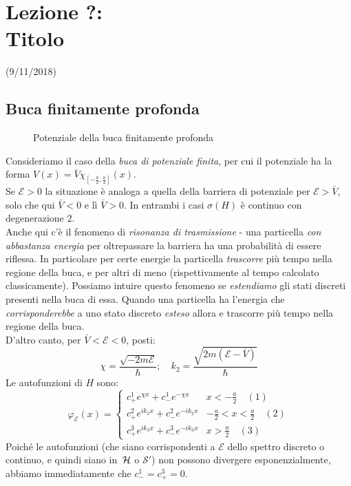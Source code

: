 \documentclass[../../FisicaTeorica.tex]{subfiles}
\begin{document}
\section{Lezione ?:\\ \large{Titolo}}
\vspace{-1em}
\begin{center}
    \small{(9/11/2018)}
\end{center}

\subsection{Buca finitamente profonda}
\begin{figure}[H]
\centering

\caption{Potenziale della buca finitamente profonda}
\end{figure}

Consideriamo il caso della \textit{buca di potenziale finita}, per cui il potenziale ha la forma $V(x)=\bar{V}\chi_{\left[-\frac{a}{2},\frac{a}{2}\right]}(x)$.\\
Se $\mathcal{E}>0$ la situazione è analoga a quella della barriera di potenziale per $\mathcal{E}>\bar{V}$, solo che qui $\bar{V}<0$ e lì $\bar{V}>0$. In entrambi i casi $\sigma(H)$ è continuo con degenerazione $2$.\\
Anche qui c'è il fenomeno di \textit{risonanza di trasmissione} - una particella \textit{con abbastanza energia} per oltrepassare la barriera ha una probabilità di essere riflessa. In particolare per certe energie la particella \textit{trascorre} più tempo nella regione della buca, e per altri di meno (rispettivamente al tempo calcolato classicamente). Possiamo intuire questo fenomeno se \textit{estendiamo} gli stati discreti presenti nella buca  di essa. Quando una particella ha l'energia che \textit{corrisponderebbe} a uno stato discreto \textit{esteso} allora  e trascorre più tempo nella regione della buca.\\

D'altro canto, per $\bar{V}<\mathcal{E}<0$, posti:
\[
\chi=\frac{\sqrt{-2m\mathcal{E}}}{\hbar}; \quad k_2=\frac{\sqrt{2m(\mathcal{E}-\bar{V})}}{\hbar}
\]
Le autofunzioni di $H$ sono:
\[
\varphi_\mathcal{E}(x)=\begin{cases}
c^1_+ e^{\chi x} + c^1_- e^{-\chi x} & x<-\frac{a}{2} \quad (1)\\
c^2_+ e^{ik_2 x} + c^2_- e^{-ik_2 x} & -\frac{a}{2}<x<\frac{a}{2}\quad (2)\\
c^3_+ e^{ik_3 x}+c^3_- e^{-ik_3 x} & x > \frac{a}{2} \quad (3)
\end{cases}
\]
Poiché le autofunzioni (che siano corrispondenti a $\mathcal{E}$ dello spettro discreto o continuo, e quindi siano in\ $\mathcal{H}$ o $\mathcal{S}'$) non possono divergere esponenzialmente, abbiamo immediatamente che $c^1_- = c^3_+ = 0$.\\
\end{document}
